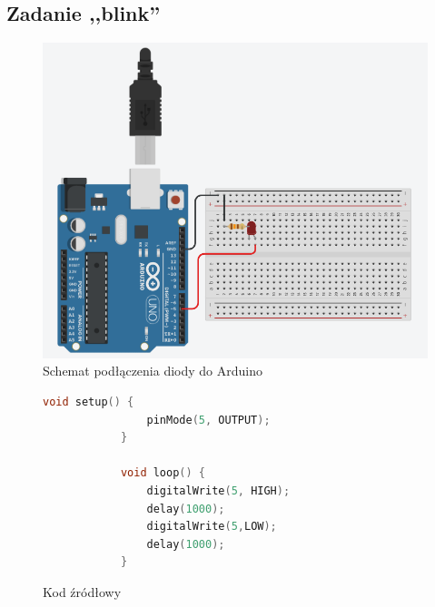 \documentclass[polish,a4paper]{article}
\begin{document}
	\subsection{Zadanie ,,blink''}
	\begin{figure}[h!]
		\begin{center}
			\includegraphics[scale=0.4]{01_blink.png}
			\caption*{Schemat podłączenia diody do Arduino}
		\end{center}
	\end{figure}
	\begin{figure}[h!]
		\begin{lstlisting}[language=C++]
			void setup() {
				pinMode(5, OUTPUT);
			}

			void loop() {
				digitalWrite(5, HIGH);
				delay(1000);
				digitalWrite(5,LOW);
				delay(1000);
			}
		\end{lstlisting}
		\caption*{Kod źródłowy}
	\end{figure}

	\newpage
\end{document}
